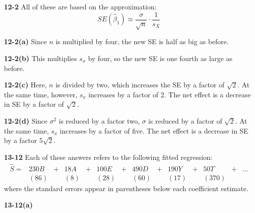 \documentclass[addpoints,12pt]{exam}\usepackage[]{graphicx}\usepackage[]{color}
\begin{document}
  
  \begin{questions}
  \item[]
  \begin{solution} \textbf{12-2}
  All of these are based on the approximation:
    $$SE(\widehat{\beta}_1) \approx \frac{\sigma}{\sqrt{n}} \cdot \frac{1}{s_X}$$
    \end{solution}
  \begin{parts}
  \item[]
  \begin{solution} \textbf{12-2(a)} Since $n$ is multiplied by four, the new SE is half as big as before. \end{solution}
  \item[]
  \begin{solution} \textbf{12-2(b)} This multiplies $s_x$ by four, so the new SE is one fourth as large as before. \end{solution}
  \item[]
  \begin{solution} \textbf{12-2(c)} Here, $n$ is divided by two, which increases the SE by a factor of $\sqrt{2}$. At the same time, however, $s_x$ increases by a factor of 2. The net effect is a decrease in SE by a factor of $\sqrt{2}$.
  \end{solution}
  \item[]
  \begin{solution} \textbf{12-2(d)} Since $\sigma^2$ is reduced by a factor two, $\sigma$ is reduced by a factor of $\sqrt{2}$. At the same time, $s_x$ increases by a factor of five. The net effect is a decrease in SE by a factor $5\sqrt{2}.$ \end{solution}
  \end{parts}
  \item[]
  \begin{solution} \textbf{13-12}
  Each of these answers refers to the following fitted regression:
    $$\begin{array}{cccccccccccccc}\widehat{S} = & 230 B& + &18A &+ &100 E& + &490 D& + &190 Y& + &50T & + & \hdots \\
  &(86)&&(8)&&(28)&&(60)&&(17)&&(370)
  \end{array}
  $$
    where the standard errors appear in parentheses below each coefficient estimate.
  \end{solution}
  \begin{parts}
  \item[]
  \begin{solution} 
  \textbf{13-12(a)}
  \begin{center}

\end{center}
\end{solution}
\end{parts}
\end{questions}
\end{document}
